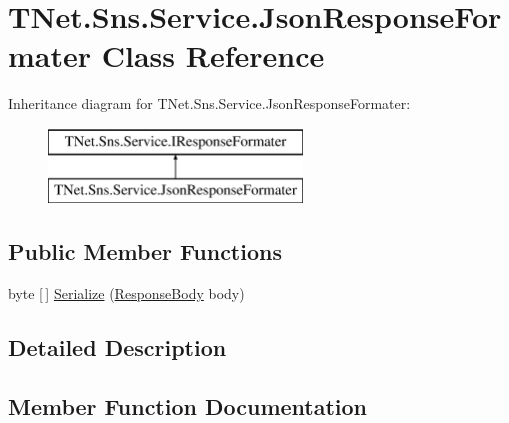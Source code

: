 \hypertarget{class_t_net_1_1_sns_1_1_service_1_1_json_response_formater}{}\section{T\+Net.\+Sns.\+Service.\+Json\+Response\+Formater Class Reference}
\label{class_t_net_1_1_sns_1_1_service_1_1_json_response_formater}


 


Inheritance diagram for T\+Net.\+Sns.\+Service.\+Json\+Response\+Formater\+:\begin{figure}[H]
\begin{center}
\leavevmode
\includegraphics[height=2.000000cm]{class_t_net_1_1_sns_1_1_service_1_1_json_response_formater}
\end{center}
\end{figure}
\subsection*{Public Member Functions}
\begin{DoxyCompactItemize}
\item 
byte \mbox{[}$\,$\mbox{]} \mbox{\hyperlink{class_t_net_1_1_sns_1_1_service_1_1_json_response_formater_a84838cfd0a9325d9eff608a37ca57ce2}{Serialize}} (\mbox{\hyperlink{class_t_net_1_1_sns_1_1_service_1_1_response_body}{Response\+Body}} body)
\end{DoxyCompactItemize}


\subsection{Detailed Description}




\subsection{Member Function Documentation}
\mbox{\label{class_t_net_1_1_sns_1_1_service_1_1_json_response_formater_a84838cfd0a9325d9eff608a37ca57ce2}} 
